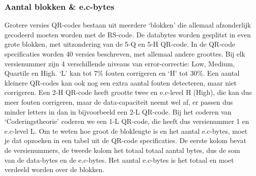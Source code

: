 \documentclass{article}
\begin{document}
\subsubsection{Aantal blokken \& e.c-bytes}
Grotere versies QR-codes bestaan uit meerdere `blokken' die allemaal afzonderlijk gecodeerd moeten worden met de RS-code. De databytes worden gesplitst in even grote blokken, met uitzondering van de 5-Q en 5-H QR-code. In de QR-code specificaties worden 40 versies beschreven, met allemaal andere groottes. Bij elk versienummer zijn 4 verschillende niveaus van error-correctie: Low, Medium, Quartile en High. `L' kan tot 7\% fouten corrigeren en `H' tot 30\%. Een aantal kleinere QR-codes kan ook nog een extra aantal fouten detecteren, maar niet corrigeren. Een 2-H QR-code heeft grootte twee en e.c-level H (High), die kan dus meer fouten corrigeren, maar de data-capaciteit neemt wel af, er passen dus minder letters in dan in bijvoorbeeld een 2-L QR-code.
Bij het coderen van `Coderingstheorie' coderen we een 1-L QR-code, die heeft dus versienummer 1 en e.c-level L. Om te weten hoe groot de bloklengte is en het aantal e.c-bytes, moet je dat opzoeken in een tabel uit de QR-code specificaties.
De eerste kolom bevat de versienummers, de tweede kolom het totaal totaal aantal bytes, dus de som van de data-bytes en de e.c-bytes. Het aantal e.c-bytes is het totaal en moet verdeeld worden over de blokken.
\end{document}
